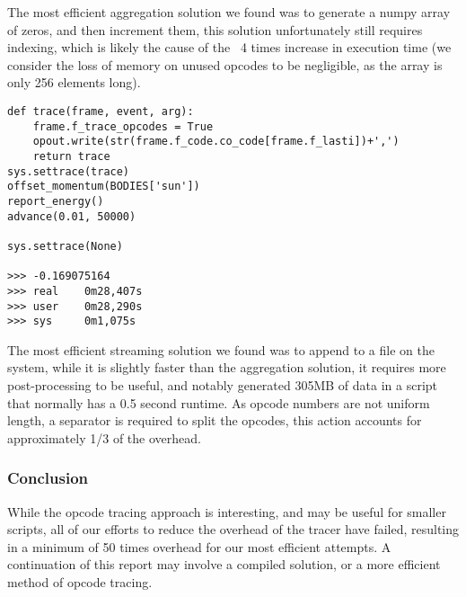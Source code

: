 The most efficient aggregation solution we found was to generate a numpy\cite{NumPy} array of zeros, and then increment
them, this solution unfortunately still requires indexing, which is likely the cause of the ~4 times increase in
execution time (we consider the loss of memory on unused opcodes to be negligible, as the array is only 256 elements
long).

\begin{lstlisting}[caption={Tracing the nbody problem using streaming},captionpos=b,label={lst:nbody-trace-stream}]
def trace(frame, event, arg):
    frame.f_trace_opcodes = True
    opout.write(str(frame.f_code.co_code[frame.f_lasti])+',')
    return trace
sys.settrace(trace)
offset_momentum(BODIES['sun'])
report_energy()
advance(0.01, 50000)

sys.settrace(None)

>>> -0.169075164
>>> real    0m28,407s
>>> user    0m28,290s
>>> sys     0m1,075s
\end{lstlisting}

The most efficient streaming solution we found was to append to a file on the system, while it is slightly faster than
the aggregation solution, it requires more post-processing to be useful, and notably generated 305MB of data in a script
that normally has a 0.5 second runtime.
As opcode numbers are not uniform length, a separator is required to split the opcodes, this action accounts for
approximately 1/3 of the overhead.

\subsubsection{Conclusion}
While the opcode tracing approach is interesting, and may be useful for smaller scripts, all of our
efforts to reduce the overhead of the tracer have failed, resulting in a minimum of 50 times overhead for our most
efficient attempts.
A continuation of this report may involve a compiled solution, or a more efficient method of opcode tracing.